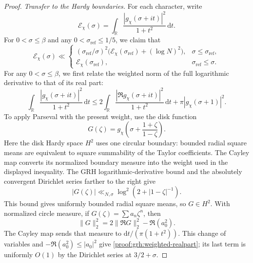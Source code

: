 \documentclass[12pt,a4paper]{amsart}
\numberwithin{equation}{section}
\def\le{\leqslant}
\theoremstyle{plain}
\theoremstyle{definition}
\theoremstyle{remark}
\begin{document}
\begin{proof}
\emph{Transfer to the Hardy boundaries.}
For each character, write
\begin{equation}\label{proof:v7l:weighted-energy-definition}
 \mathscr E_\chi(\sigma)=
 \int_{\mathbb R}\frac{|g_\chi(\sigma+it)|^2}{1+t^2}\,\mathrm{d}t.
\end{equation}
For $0<\sigma\le\beta$ and any $0<\sigma_{\mathrm{ref}}\le1/5$,
we claim that
\begin{equation}\label{proof:v7l:energy-transfer-bound}
 \mathscr E_\chi(\sigma)\ll
 \begin{cases}
 (\sigma_{\mathrm{ref}}/\sigma)^2
    \bigl(\mathscr E_\chi(\sigma_{\mathrm{ref}})+(\log N)^2\bigr),
       &\sigma\le\sigma_{\mathrm{ref}},\\
 \mathscr E_\chi(\sigma_{\mathrm{ref}}),&\sigma_{\mathrm{ref}}\le\sigma.
 \end{cases}
\end{equation}
For any $0<\sigma\le\beta$, we first relate the
weighted norm of the full logarithmic derivative to that of its
real part:
\begin{equation}\label{proof:grh:weighted-realpart}
 \int_{\mathbb R}\frac{|g_\chi(\sigma+it)|^2}{1+t^2}\,\mathrm{d}t
 \le2\int_{\mathbb R}
       \frac{|\Re g_\chi(\sigma+it)|^2}{1+t^2}\,\mathrm{d}t
       +\pi|g_\chi(\sigma+1)|^2.
\end{equation}
To apply Parseval with the present weight, use the disk function
\[
 G(\zeta)=g_\chi\!\left(\sigma+\frac{1+\zeta}{1-\zeta}\right).
\]
Here the disk Hardy space $H^2$ uses one circular boundary:
bounded radial square means are equivalent to square summability
of the Taylor coefficients. The Cayley map converts its normalized
boundary measure into the weight used in the displayed inequality.
The GRH logarithmic-derivative bound and the absolutely
convergent Dirichlet series farther to the right give
\[
 |G(\zeta)|\ll_{N,\sigma}\log^2(2+|1-\zeta|^{-1}).
\]
This bound gives uniformly bounded radial square means, so $G\in H^2$.
With normalized circle measure, if $G(\zeta)=\sum a_n\zeta^n$, then
\[
 \|G\|_2^2=2\|\Re G\|_2^2-\Re(a_0^2).
\]
The Cayley map sends that measure to $\mathrm{d}t/(\pi(1+t^2))$.
This change of variables and $-\Re(a_0^2)\le|a_0|^2$ give
\eqref{proof:grh:weighted-realpart}; its last term is uniformly
$O(1)$ by the Dirichlet series at $3/2+\sigma$.


\end{proof}
\end{document}
